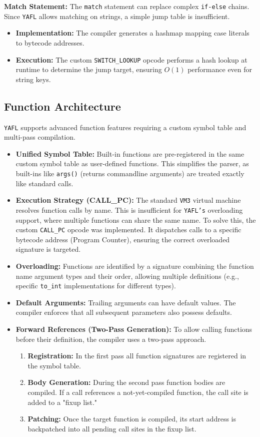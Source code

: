 \documentclass[11pt,a4paper]{article}
\begin{document}
\textbf{Match Statement:}
The \texttt{match} statement can replace complex \texttt{if-else} chains. Since \texttt{YAFL} allows matching on strings, a simple jump table is insufficient.
\begin{itemize}
    \item \textbf{Implementation:} The compiler generates a hashmap mapping case literals to bytecode addresses.
    \item \textbf{Execution:} The custom \texttt{SWITCH\_LOOKUP} opcode performs a hash lookup at runtime to determine the jump target, ensuring $O(1)$ performance even for string keys.
\end{itemize}

\subsection{Function Architecture}
\texttt{YAFL} supports advanced function features requiring a custom symbol table and multi-pass compilation.
\begin{itemize}
    \item \textbf{Unified Symbol Table:} Built-in functions are pre-registered in the same custom symbol table as user-defined functions.
    This simplifies the parser, as built-ins like \texttt{args()} (returns commandline arguments) are treated exactly like standard calls.
    \item \textbf{Execution Strategy (CALL\_PC):} The standard \texttt{VM3} virtual machine resolves function calls by name.
    This is insufficient for \texttt{YAFL's} overloading support, where multiple functions can share the same name.
    To solve this, the custom \texttt{CALL\_PC} opcode was implemented. It dispatches calls to a specific bytecode address (Program Counter), ensuring the correct overloaded signature is targeted.
    \item \textbf{Overloading:} Functions are identified by a signature combining the function name argument types and their order, allowing multiple definitions (e.g., specific \texttt{to\_int} implementations for different types).
    \item \textbf{Default Arguments:} Trailing arguments can have default values.
    The compiler enforces that all subsequent parameters also possess defaults.
    \item \textbf{Forward References (Two-Pass Generation):}
    To allow calling functions before their definition, the compiler uses a two-pass approach.
    \begin{enumerate}
        \item \textbf{Registration:} In the first pass all function signatures are registered in the symbol table.
        \item \textbf{Body Generation:} During the second pass function bodies are compiled.
        If a call references a not-yet-compiled function, the call site is added to a "fixup list."
        \item \textbf{Patching:} Once the target function is compiled, its start address is backpatched into all pending call sites in the fixup list.
    \end{enumerate}
\end{itemize}
\end{document}
